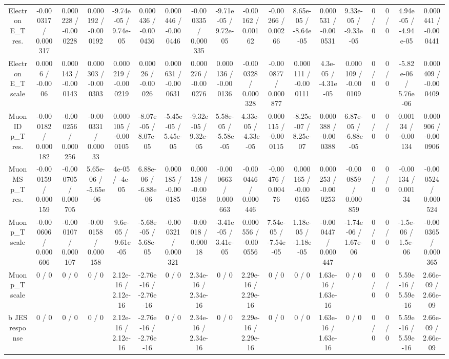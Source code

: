\documentclass[10pt]{article}
\begin{document}
\begin{table}[htbp]
\begin{center}
\begin{tabular}{|c|c|c|c|c|c|c|c|c|c|c|c|c|c|c|c|c|c|}
  Electron E_{T} res. & -0.000317 / 0.000317 & 0.000228 / -0.000228 & 0.000192 / -0.000192 & -9.74e-05 / 9.74e-05 & 0.000436 / -0.000436 & 0.000446 / -0.000446 & -0.000335 / 0.000335 & -9.71e-05 / 9.72e-05 & -0.00162 / 0.00162 & -0.00266 / 0.00266 & 8.65e-05 / -8.64e-05 & 0.000531 / -0.000531 & 9.33e-05 / -9.33e-05 & 0 / 0 & 0 / 0 & 4.94e-05 / -4.94e-05 & 0.000441 / -0.000441 \\ 
  Electron E_{T} scale & 0.0006 / -0.0006 & 0.000143 / -0.000143 & 0.000303 / -0.000303 & 0.000219 / -0.000219 & 0.00026 / -0.00026 & 0.000631 / -0.000631 & 0.000276 / -0.000276 & 0.000136 / -0.000136 & -0.000328 / 0.000328 & -0.000877 / 0.000877 & 0.000111 / -0.000111 & 4.3e-05 / -4.31e-05 & 0.000109 / -0.000109 & 0 / 0 & 0 / 0 & -5.82e-06 / 5.76e-06 & 0.000409 / -0.000409 \\ 
  Muon ID p_{T} res. & -0.000182 / 0.000182 & -0.000256 / 0.000256 & -0.000331 / 0.00033 & 0.000105 / -0.000105 & -8.07e-05 / 8.07e-05 & -5.45e-05 / 5.45e-05 & -9.32e-05 / 9.32e-05 & 5.58e-05 / -5.58e-05 & 4.33e-05 / -4.33e-05 & 0.000115 / -0.000115 & -8.25e-07 / 8.25e-07 & 0.000388 / -0.000388 & 6.87e-05 / -6.88e-05 & 0 / 0 & 0 / 0 & 0.00134 / -0.00134 & 0.000906 / -0.000906 \\ 
  Muon MS p_{T} res. & -0.000159 / 0.000159 & -0.000705 / 0.000705 & 5.65e-06 / -5.65e-06 & 4e-05 / -4e-05 & 6.88e-06 / -6.88e-06 & 0.000185 / -0.000185 & 0.000158 / -0.000158 & -0.000663 / 0.000663 & -0.000446 / 0.000446 & -0.00476 / 0.00476 & 0.000165 / -0.000165 & 0.000253 / -0.000253 & -0.000859 / 0.000859 & 0 / 0 & 0 / 0 & -0.00134 / 0.00134 & -0.000524 / 0.000524 \\ 
  Muon p_{T} scale & -0.000606 / 0.000606 & -0.000107 / 0.000107 & -0.000158 / 0.000158 & 9.6e-05 / -9.61e-05 & -5.68e-05 / 5.68e-05 & -0.000321 / 0.000321 & -0.00018 / 0.00018 & -3.41e-05 / 3.41e-05 & 0.000556 / -0.000556 & 7.54e-05 / -7.54e-05 & 1.18e-05 / -1.18e-05 & -0.000447 / 0.000447 & -1.74e-06 / 1.67e-06 & 0 / 0 & 0 / 0 & -1.5e-06 / 1.5e-06 & -0.000365 / 0.000365 \\ 
  Muon p_{T} scale & 0 / 0 & 0 / 0 & 0 / 0 & 2.12e-16 / 2.12e-16 & -2.76e-16 / -2.76e-16 & 0 / 0 & 2.34e-16 / 2.34e-16 & 0 / 0 & 2.29e-16 / 2.29e-16 & 0 / 0 & 0 / 0 & 1.63e-16 / 1.63e-16 & 0 / 0 & 0 / 0 & 0 / 0 & 5.59e-16 / 5.59e-16 & 2.66e-09 / 2.66e-09 \\ 
  b JES response & 0 / 0 & 0 / 0 & 0 / 0 & 2.12e-16 / 2.12e-16 & -2.76e-16 / -2.76e-16 & 0 / 0 & 2.34e-16 / 2.34e-16 & 0 / 0 & 2.29e-16 / 2.29e-16 & 0 / 0 & 0 / 0 & 1.63e-16 / 1.63e-16 & 0 / 0 & 0 / 0 & 0 / 0 & 5.59e-16 / 5.59e-16 & 2.66e-09 / 2.66e-09 \\ 

\end{tabular}
\end{center}
\end{table}
\end{document}
